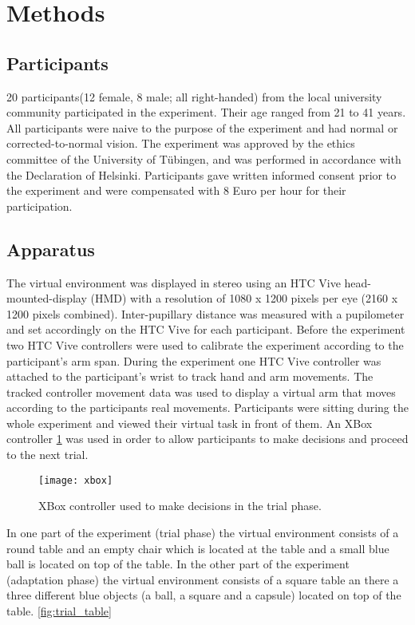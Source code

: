\section{Methods}

\subsection{Participants}
20 participants(12 female, 8 male; all right-handed) from the local university community participated in the experiment. Their age ranged from 21 to 41 years. All participants were naive to the purpose of the experiment and had normal or corrected-to-normal vision. The experiment was approved by the ethics committee of the University of T\"ubingen, and was performed in accordance with the Declaration of Helsinki. Participants gave written informed consent prior to the experiment and were compensated with 8 Euro per hour for their participation. 

\subsection{Apparatus}
The virtual environment was displayed in stereo using an HTC Vive head-mounted-display (HMD) with a resolution of 1080 x 1200 pixels per eye (2160 x 1200 pixels combined). Inter-pupillary distance was measured with a pupilometer and set accordingly on the HTC Vive for each participant. Before the experiment two HTC Vive controllers were used to calibrate the experiment according to the participant's arm span. During the experiment one HTC Vive controller was attached to the participant's wrist to track hand and arm movements. The tracked controller movement data was used to display a virtual arm that moves according to the participants real movements. Participants were sitting during the whole experiment and viewed their virtual task in front of them. An XBox controller \ref{fig:xbox} was used in order to allow participants to make decisions and proceed to the next trial.

\begin{figure}
\centering
  \texttt{[image: xbox]}
  \caption{XBox controller used to make decisions in the trial phase.} 
  \label{fig:xbox}
\end{figure}

In one part of the experiment (trial phase) the virtual environment consists of a round table and an empty chair which is located at the table and a small blue ball is located on top of the table. In the other part of the experiment (adaptation phase) the virtual environment consists of a square table an there a three different blue objects (a ball, a square and a capsule) located on top of the table. \ref{fig:trial_table}

